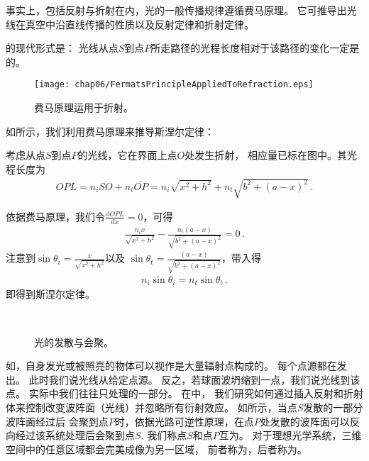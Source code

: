 事实上，包括反射与折射在内，光的一般传播规律遵循费马原理。
它可推导出光线在真空中沿直线传播的性质以及反射定律和折射定律。
\begin{proposition}
    的现代形式是：
    光线从点$S$到点$P$所走路径的光程长度相对于该路径的变化一定是的。
\end{proposition}

\begin{figure}[htbp]
    \centering\texttt{[image: chap06/FermatsPrincipleAppliedToRefraction.eps]}
    \caption{费马原理运用于折射。}
    \label{fig:6.28}
\end{figure}

如所示，我们利用费马原理来推导斯涅尔定律：
\begin{prove}
    考虑从点$S$到点$P$的光线，它在界面上点$O$处发生折射，
    相应量已标在图中。其光程长度为
    \begin{align}
        OPL=n_i\overline{SO}+n_t\overline{OP}=n_i\sqrt{x^2+h^2}+n_t\sqrt{b^2+(a-x)^2}\, .
    \end{align}

    依据费马原理，我们令$\displaystyle\frac{\mathrm{d}OPL}{\mathrm{d}x}=0$，可得
    \begin{align}
        \frac{n_ix}{\sqrt{x^2+h^2}}-\frac{n_t(a-x)}{\sqrt{b^2+(a-x)^2}}=0\, .
    \end{align}
    注意到$\displaystyle\sin\theta_i=\frac{x}{\sqrt{x^2+h^2}}$以及
    $\displaystyle\sin\theta_t=\frac{(a-x)}{\sqrt{b^2+(a-x)^2}}$，带入得
    \begin{align}
        n_i\sin\theta_i=n_t\sin\theta_t\, .
    \end{align}
    即得到斯涅尔定律。
\end{prove}

\begin{figure}[htbp]
    \centering
    \,
    \caption{光的发散与会聚。}
    \label{fig:6.29}
\end{figure}

如，自身发光或被照亮的物体可以视作是大量辐射点构成的。
每个点源都在发出。
此时我们说光线从给定点源。
反之，若球面波坍缩到一点，我们说光线到该点。
实际中我们往往只处理的一部分。
在中，
我们研究如何通过插入反射和折射体来控制改变波阵面（光线）并忽略所有衍射效应。
如所示，当点$S$发散的一部分波阵面经过后
会聚到点$P$时，依据光路可逆性原理，在点$P$处发散的波阵面可以反向经过该系统处理后会聚到点$S$.
我们称点$S$和点$P$互为。
对于理想光学系统，三维空间中的任意区域都会完美成像为另一区域，
前者称为，后者称为。

